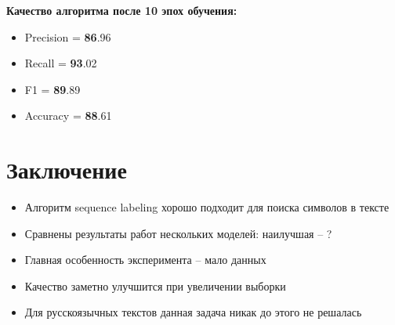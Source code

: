 \documentclass[12pt,twoside]{article}
\begin{document}
	\textbf{	Качество алгоритма после 10 эпох обучения:}
\begin{itemize}
	\item Precision  =  \textbf{86}.96
	\item Recall  =  \textbf{93}.02
	\item F1  =  \textbf{89}.89
	\item Accuracy  =  \textbf{88}.61
\end{itemize}


\section{Заключение}
	\begin{itemize}
		\item Алгоритм sequence labeling хорошо подходит для поиска символов в тексте
		\item Сравнены результаты работ нескольких моделей: наилучшая – ?
		\item Главная особенность эксперимента -- мало данных
		\item Качество заметно улучшится при увеличении выборки
		\item Для русскоязычных текстов данная задача никак до этого не решалась
	\end{itemize}


\newpage
\end{document}

